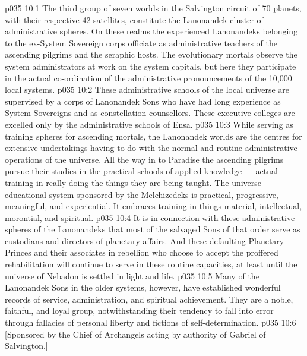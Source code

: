 \vs p035 10:1 The third group of seven worlds in the Salvington circuit of 70 planets, with their respective 42 satellites, constitute the Lanonandek cluster of administrative spheres. On these realms the experienced Lanonandeks belonging to the ex\hyp{}System Sovereign corps officiate as administrative teachers of the ascending pilgrims and the seraphic hosts. The evolutionary mortals observe the system administrators at work on the system capitals, but here they participate in the actual co\hyp{}ordination of the administrative pronouncements of the 10,000 local systems.
\vs p035 10:2 These administrative schools of the local universe are supervised by a corps of Lanonandek Sons who have had long experience as System Sovereigns and as constellation counsellors. These executive colleges are excelled only by the administrative schools of Ensa.
\vs p035 10:3 While serving as training spheres for ascending mortals, the Lanonandek worlds are the centres for extensive undertakings having to do with the normal and routine administrative operations of the universe. All the way in to Paradise the ascending pilgrims pursue their studies in the practical schools of applied knowledge --- actual training in really doing the things they are being taught. The universe educational system sponsored by the Melchizedeks is practical, progressive, meaningful, and experiential. It embraces training in things material, intellectual, morontial, and spiritual.
\vs p035 10:4 \pc It is in connection with these administrative spheres of the Lanonandeks that most of the salvaged Sons of that order serve as custodians and directors of planetary affairs. And these defaulting Planetary Princes and their associates in rebellion who choose to accept the proffered rehabilitation will continue to serve in these routine capacities, at least until the universe of Nebadon is settled in light and life.
\vs p035 10:5 \pc Many of the Lanonandek Sons in the older systems, however, have established wonderful records of service, administration, and spiritual achievement. They are a noble, faithful, and loyal group, notwithstanding their tendency to fall into error through fallacies of personal liberty and fictions of self\hyp{}determination.
\vsetoff
\vs p035 10:6 [Sponsored by the Chief of Archangels acting by authority of Gabriel of Salvington.]
